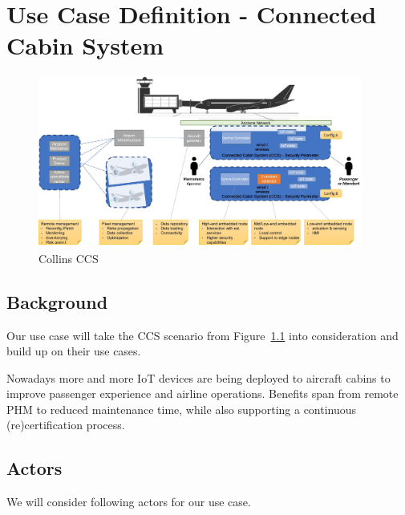 \chapter{Use Case Definition - Connected Cabin System}

\begin{figure}
	\begin{center}
		\includegraphics[width=0.95\textwidth]{figures/collins-ccs.jpg}
	\end{center}
	\caption{Collins CCS}
	\label{fig:Collins CCS}
\end{figure}

\section{Background}

Our use case will take the CCS scenario from Figure~\ref{fig:Collins CCS} into consideration and build up on their use cases.

Nowadays more and more IoT devices are being deployed to aircraft cabins to improve passenger experience and airline
operations. Benefits span from remote PHM to reduced maintenance time, while also supporting a
continuous (re)certification process. %

\section{Actors}

We will consider following actors for our use case.

